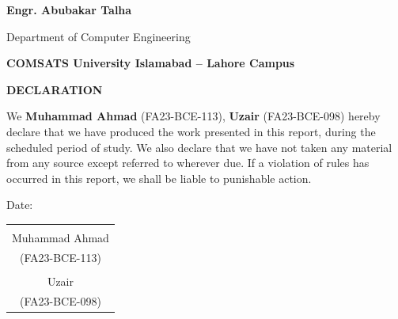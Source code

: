 \documentclass[12pt,a4paper]{article}
\begin{document}
\begin{titlepage}
    \vspace{0.4cm}
    
    {\textbf{Engr. Abubakar Talha}}
    
    \vfill
    
    {\large Department of Computer Engineering}
    
    \vspace{0.5cm}
    
    {\large\textbf{COMSATS University Islamabad -- Lahore Campus}}  
    
    \vspace{1cm}
        
\end{titlepage}

\newpage
\begin{center}
    {\Large\textbf{DECLARATION}}
\end{center}


\noindent We \textbf{Muhammad Ahmad} (FA23-BCE-113), \textbf{Uzair} (FA23-BCE-098) hereby declare that we have produced the work presented in this report, during the scheduled period of study. We also declare that we have not taken any material from any source except referred to wherever due. If a violation of rules has occurred in this report, we shall be liable to punishable action.

\vspace{1cm}
 
\noindent Date:\underline{\hspace{6cm}}

\vspace{1cm}

\begin{flushright}
\begin{tabular}{c}
\underline{\hspace{4cm}} \\
Muhammad Ahmad \\
(FA23-BCE-113) \\[0.8cm]
\underline{\hspace{4cm}} \\
Uzair \\
(FA23-BCE-098)
\end{tabular}
\end{flushright}
\newpage


\vspace{2cm}
\end{document}
